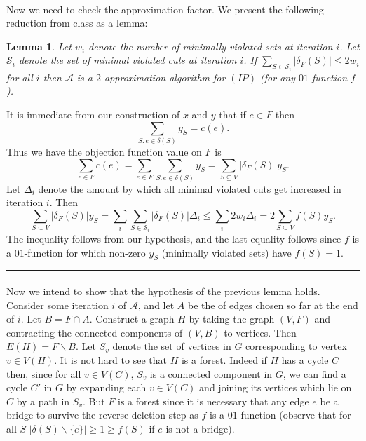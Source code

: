 \documentclass[letterpaper,12pt,oneside,onecolumn]{article}
\newcommand{\cA}{\mathcal{A}} \newcommand{\cB}{\mathcal{B}}
\newcommand{\cS}{\mathcal{S}} \newcommand{\cT}{\mathcal{T}}
\newenvironment{proof}{{\bf Proof:  }}{\hfill\rule{2mm}{2mm}}
\newtheorem{lemma}[fact]{Lemma}
\begin{document}
\paragraph{}
Now we need to check the approximation factor. We present the following reduction from class as a lemma:
\begin{lemma}\label{lemma:degree}
Let $w_i$ denote the number of minimally violated sets at iteration $i$.  Let $\cS_i$ denote the set of minimal violated cuts at iteration $i$. If $\sum_{S\in \cS_i} |\delta_F(S)| \leq 2w_i$ for all $i$ then $\cA$ is a $2$-approximation algorithm for $(IP)$ (for any $01$-function $f$).
\end{lemma}
\begin{proof}
It is immediate from our construction of $x$ and $y$ that if $e \in F$ then
$$\sum_{S : e\in\delta(S)} y_S = c(e).$$
Thus we have the objection function value on $F$ is
$$\sum_{e\in F} c(e) = \sum_{e\in F} \sum_{S : e\in\delta(S)} y_S = \sum_{S\subseteq V} |\delta_F(S)|y_S.$$
Let $\Delta_i$ denote the amount by which all minimal violated cuts get increased in iteration $i$. Then
$$\sum_{S\subseteq V} |\delta_F(S)|y_S = \sum_{i} \sum_{S\in \cS_i} |\delta_F(S)|\Delta_i \leq \sum_{i} 2w_i \Delta_i = 2\sum_{S\subseteq V} f(S) y_S.$$
The inequality follows from our hypothesis, and the last equality follows since $f$ is a $01$-function for which non-zero $y_S$ (minimally violated sets) have $f(S) = 1$. 
\end{proof}
\paragraph{}
Now we intend to show that the hypothesis of the previous lemma holds. Consider some iteration $i$ of $\cA$, and let $A$ be the of edges chosen so far at the end of $i$. Let $B = F \cap A$. Construct a graph $H$ by taking the graph $(V,F)$ and contracting the connected components of $(V,B)$ to vertices. Then $E(H) = F\backslash B$. Let $S_v$ denote the set of vertices in $G$ corresponding to vertex $v \in V(H)$. It is not hard to see that $H$ is a forest. Indeed if $H$ has a cycle $C$ then, since for all $v \in V(C)$, $S_v$ is a connected component in $G$, we can find a cycle $C'$ in $G$ by expanding each $v \in V(C)$ and joining its vertices which lie on $C$ by a path in $S_v$. But $F$ is a forest since it is necessary that any edge $e$ be a bridge to survive the reverse deletion step as $f$ is a $01$-function (observe that for all $S$ $|\delta(S) \backslash \{e\}| \geq 1 \geq f(S)$ if $e$ is not a bridge).
\end{document}
